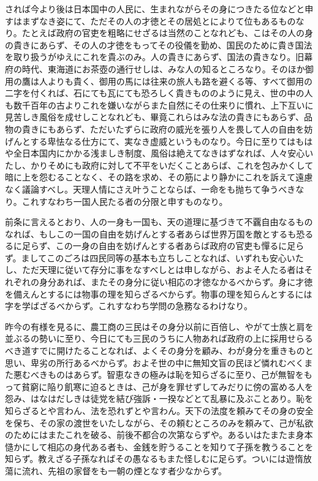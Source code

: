 \documentclass[a4paper, platex, dvipdfmx]{jsarticle}
\begin{document}
されば今より後は日本国中の人民に、生まれながらその身につきたる位などと申すはまずなき姿にて、ただその人の才徳とその居処とによりて位もあるものなり。たとえば政府の官吏を粗略にせざるは当然のことなれども、こはその人の身の貴きにあらず、その人の才徳をもってその役儀を勤め、国民のために貴き国法を取り扱うがゆえにこれを貴ぶのみ。人の貴きにあらず、国法の貴きなり。旧幕府の時代、東海道にお茶壺の通行せしは、みな人の知るところなり。そのほか御用の鷹は人よりも貴く、御用の馬には往来の旅人も路を避くる等、すべて御用の二字を付くれば、石にても瓦にても恐ろしく貴きもののように見え、世の中の人も数千百年の古よりこれを嫌いながらまた自然にその仕来りに慣れ、上下互いに見苦しき風俗を成せしことなれども、畢竟これらはみな法の貴きにもあらず、品物の貴きにもあらず、ただいたずらに政府の威光を張り人を畏して人の自由を妨げんとする卑怯なる仕方にて、実なき虚威というものなり。今日に至りてはもはや全日本国内にかかる浅ましき制度、風俗は絶えてなきはずなれば、人々安心いたし、かりそめにも政府に対して不平をいだくことあらば、これを包みかくして暗に上を怨むることなく、その路を求め、その筋により静かにこれを訴えて遠慮なく議論すべし。天理人情にさえ叶うことならば、一命をも抛ちて争うべきなり。これすなわち一国人民たる者の分限と申すものなり。

前条に言えるとおり、人の一身も一国も、天の道理に基づきて不覊自由なるものなれば、もしこの一国の自由を妨げんとする者あらば世界万国を敵とするも恐るるに足らず、この一身の自由を妨げんとする者あらば政府の官吏も憚るに足らず。ましてこのごろは四民同等の基本も立ちしことなれば、いずれも安心いたし、ただ天理に従いて存分に事をなすべしとは申しながら、およそ人たる者はそれぞれの身分あれば、またその身分に従い相応の才徳なかるべからず。身に才徳を備えんとするには物事の理を知らざるべからず。物事の理を知らんとするには字を学ばざるべからず。これすなわち学問の急務なるわけなり。

昨今の有様を見るに、農工商の三民はその身分以前に百倍し、やがて士族と肩を並ぶるの勢いに至り、今日にても三民のうちに人物あれば政府の上に採用せらるべき道すでに開けたることなれば、よくその身分を顧み、わが身分を重きものと思い、卑劣の所行あるべからず。およそ世の中に無知文盲の民ほど憐れむべくまた悪むべきものはあらず。智恵なきの極みは恥を知らざるに至り、己が無智をもって貧窮に陥り飢寒に迫るときは、己が身を罪せずしてみだりに傍の富める人を怨み、はなはだしきは徒党を結び強訴・一揆などとて乱暴に及ぶことあり。恥を知らざるとや言わん、法を恐れずとや言わん。天下の法度を頼みてその身の安全を保ち、その家の渡世をいたしながら、その頼むところのみを頼みて、己が私欲のためにはまたこれを破る、前後不都合の次第ならずや。あるいはたまたま身本慥かにして相応の身代ある者も、金銭を貯うることを知りて子孫を教うることを知らず。教えざる子孫なればその愚なるもまた怪しむに足らず。ついには遊惰放蕩に流れ、先祖の家督をも一朝の煙となす者少なからず。
\end{document}

